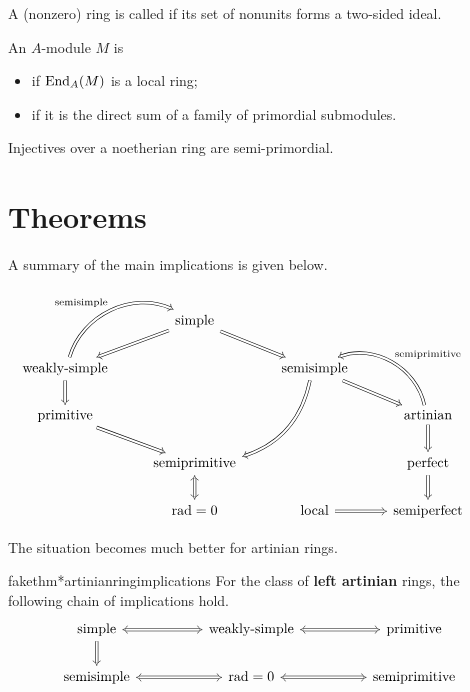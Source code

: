 \documentclass[12pt]{article}
\begin{document}
\begin{defn}
	A (nonzero) ring is called  if its set of nonunits forms a two-sided ideal.
\end{defn}

\begin{defn}
	An $A$-module $M$ is 
	\begin{itemize}
		\item {} if $\operatorname{End}_{A}(M)$ is a local ring;
		\item {} if it is the direct sum of a family of primordial submodules.
	\end{itemize}
\end{defn}
Injectives over a noetherian ring are semi-primordial.

\part{Theorems} \label{part:theorems}

A summary of the main implications is given below.

\begin{equation*} 
	\begin{tikzcd}
	 & \text{simple} \arrow[ld, Rightarrow] \arrow[rd, Rightarrow] && \\
	\text{weakly-simple} \arrow[ru, Rightarrow, "\text{semisimple}", bend left=49] \arrow[d, Rightarrow] && \text{semisimple} \arrow[ldd, Rightarrow, bend left] \arrow[rd, Rightarrow] & \\
	\text{primitive} \arrow[rd, Rightarrow]  & & & \text{artinian} \arrow[lu, "\text{semiprimitive}"', Rightarrow, bend right=49] \arrow[d, Rightarrow] & \\
 & \text{semiprimitive} \arrow[d, Leftrightarrow]  &  & \text{perfect} \arrow[d, Rightarrow] \\
 & \rad = 0 & \text{local} \arrow[r, Rightarrow] & \text{semiperfect}  &
	\end{tikzcd}
\end{equation*}

The situation becomes much better for artinian rings.

\begin{restatable}[]{fakethm*}{artinianringimplications} \label{thm:artinian-ring-implications}
	For the class of \textbf{{\color{red}left artinian}} rings, the following chain of implications hold.
	\begin{equation*} 
		\begin{tikzcd}[ampersand replacement = \&]
			\text{simple} \arrow[rr, Leftrightarrow] \arrow[d, Rightarrow] \&  \& \text{weakly-simple} \arrow[rr, Leftrightarrow] \&  \& \text{primitive} \\
		\text{semisimple} \arrow[rr, Leftrightarrow]  \&  \& \rad = 0 \arrow[rr, Leftrightarrow] \& \& \text{semiprimitive}
		\end{tikzcd}	
	\end{equation*}
\end{restatable}
\end{document}

